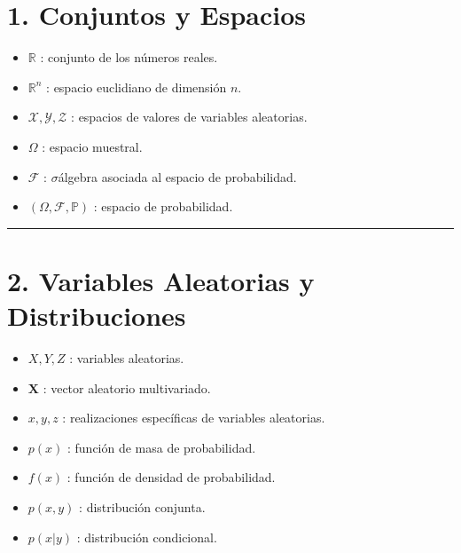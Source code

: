 \documentclass[letterpaper,10pt,english]{jupyterBook}
\begin{document}
\section{1. Conjuntos y Espacios}
\label{\detokenize{00_frontmatter/notation:conjuntos-y-espacios}}\begin{itemize}
\item {} 
\sphinxAtStartPar
\(\mathbb{R}\) : conjunto de los números reales.

\item {} 
\sphinxAtStartPar
\(\mathbb{R}^n\) : espacio euclidiano de dimensión \(n\).

\item {} 
\sphinxAtStartPar
\(\mathcal{X}, \mathcal{Y}, \mathcal{Z}\) : espacios de valores de variables aleatorias.

\item {} 
\sphinxAtStartPar
\(\Omega\) : espacio muestral.

\item {} 
\sphinxAtStartPar
\(\mathcal{F}\) : \(\sigma\)\sphinxhyphen{}álgebra asociada al espacio de probabilidad.

\item {} 
\sphinxAtStartPar
\((\Omega, \mathcal{F}, \mathbb{P})\) : espacio de probabilidad.

\end{itemize}


\bigskip\hrule\bigskip



\section{2. Variables Aleatorias y Distribuciones}
\label{\detokenize{00_frontmatter/notation:variables-aleatorias-y-distribuciones}}\begin{itemize}
\item {} 
\sphinxAtStartPar
\(X, Y, Z\) : variables aleatorias.

\item {} 
\sphinxAtStartPar
\(\mathbf{X}\) : vector aleatorio multivariado.

\item {} 
\sphinxAtStartPar
\(x, y, z\) : realizaciones específicas de variables aleatorias.

\item {} 
\sphinxAtStartPar
\(p(x)\) : función de masa de probabilidad.

\item {} 
\sphinxAtStartPar
\(f(x)\) : función de densidad de probabilidad.

\item {} 
\sphinxAtStartPar
\(p(x,y)\) : distribución conjunta.

\item {} 
\sphinxAtStartPar
\(p(x|y)\) : distribución condicional.

\end{itemize}
\end{document}
